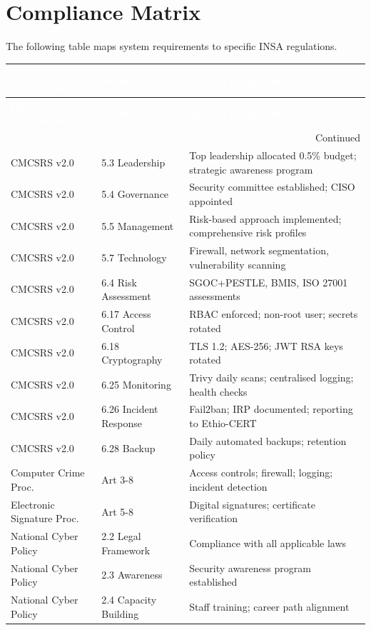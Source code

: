 \section{Compliance Matrix}
The following table maps system requirements to specific INSA regulations.

\begin{center}
\begin{longtable}{|p{3cm}|p{3cm}|p{4.5cm}|}
\hline
\rowcolor{mooveblue}
\textcolor{white}{\textbf{INSA Regulation}} & \textcolor{white}{\textbf{Section}} & \textcolor{white}{\textbf{System Compliance Evidence}} \\
\hline
\endfirsthead
\hline
\rowcolor{mooveblue}
\textcolor{white}{\textbf{INSA Regulation}} & \textcolor{white}{\textbf{Section}} & \textcolor{white}{\textbf{System Compliance Evidence}} \\
\hline
\endhead
\hline
\multicolumn{3}{|r|}{Continued} \\
\hline
\endfoot
\hline
\endlastfoot
CMCSRS v2.0 & 5.3 Leadership & Top leadership allocated 0.5\% budget; strategic awareness program \\
CMCSRS v2.0 & 5.4 Governance & Security committee established; CISO appointed \\
CMCSRS v2.0 & 5.5 Management & Risk-based approach implemented; comprehensive risk profiles \\
CMCSRS v2.0 & 5.7 Technology & Firewall, network segmentation, vulnerability scanning \\
CMCSRS v2.0 & 6.4 Risk Assessment & SGOC+PESTLE, BMIS, ISO 27001 assessments \\
CMCSRS v2.0 & 6.17 Access Control & RBAC enforced; non-root user; secrets rotated \\
CMCSRS v2.0 & 6.18 Cryptography & TLS 1.2; AES-256; JWT RSA keys rotated \\
CMCSRS v2.0 & 6.25 Monitoring & Trivy daily scans; centralised logging; health checks \\
CMCSRS v2.0 & 6.26 Incident Response & Fail2ban; IRP documented; reporting to Ethio-CERT \\
CMCSRS v2.0 & 6.28 Backup & Daily automated backups; retention policy \\
Computer Crime Proc. & Art 3-8 & Access controls; firewall; logging; incident detection \\
Electronic Signature Proc. & Art 5-8 & Digital signatures; certificate verification \\
National Cyber Policy & 2.2 Legal Framework & Compliance with all applicable laws \\
National Cyber Policy & 2.3 Awareness & Security awareness program established \\
National Cyber Policy & 2.4 Capacity Building & Staff training; career path alignment \\
\hline
\end{longtable}
\end{center}

